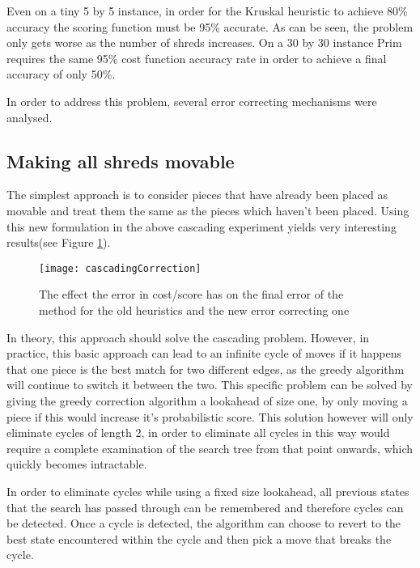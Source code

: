 Even on a tiny 5 by 5 instance, in order for the Kruskal heuristic to achieve 80\% accuracy the scoring function must be 95\% accurate. As can be seen, the problem only gets worse as the number of shreds increases. On a 30 by 30 instance Prim requires the same 95\% cost function accuracy rate in order to achieve a final accuracy of only 50\%.

In order to address this problem, several error correcting mechanisms were analysed. 

\subsection{Making all shreds movable}
The simplest approach is to consider pieces that have already been placed as movable and treat them the same as the pieces which haven’t been placed. Using this new formulation in the above cascading experiment yields very interesting results(see Figure \ref{fig:cascadingCorr}).

\begin{figure}[h]
  \centering
  \texttt{[image: cascadingCorrection]}
  \caption{The effect the error in cost/score has on the final error of the method for the old heuristics and the new error correcting one }
  \label{fig:cascadingCorr}
\end{figure}

In theory, this approach should solve the cascading problem.  However, in practice, this basic approach can lead to an infinite cycle of moves if it happens that one piece is the best match for two different edges, as the greedy algorithm will continue to switch it between the two. This specific problem can be solved by giving the greedy correction algorithm a lookahead of size one, by only moving a piece if this would increase it’s probabilistic score. This solution however will only eliminate cycles of length 2, in order to eliminate all cycles in this way would require a complete examination of the search tree from that point onwards, which quickly becomes intractable.

In order to eliminate cycles while using a fixed size lookahead, all previous states that the search has passed through can be remembered and therefore cycles can be detected. Once a cycle is detected, the algorithm can choose to revert to the best state encountered within the cycle and then pick a move that breaks the cycle.

